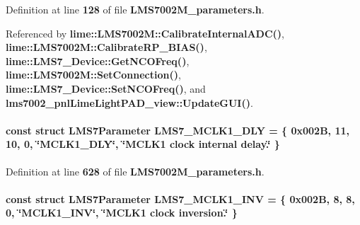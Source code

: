 Definition at line {\bf 128} of file {\bf L\+M\+S7002\+M\+\_\+parameters.\+h}.



Referenced by {\bf lime\+::\+L\+M\+S7002\+M\+::\+Calibrate\+Internal\+A\+D\+C()}, {\bf lime\+::\+L\+M\+S7002\+M\+::\+Calibrate\+R\+P\+\_\+\+B\+I\+A\+S()}, {\bf lime\+::\+L\+M\+S7\+\_\+\+Device\+::\+Get\+N\+C\+O\+Freq()}, {\bf lime\+::\+L\+M\+S7002\+M\+::\+Set\+Connection()}, {\bf lime\+::\+L\+M\+S7\+\_\+\+Device\+::\+Set\+N\+C\+O\+Freq()}, and {\bf lms7002\+\_\+pnl\+Lime\+Light\+P\+A\+D\+\_\+view\+::\+Update\+G\+U\+I()}.

\paragraph[{L\+M\+S7\+\_\+\+M\+C\+L\+K1\+\_\+\+D\+LY}]{\setlength{\rightskip}{0pt plus 5cm}const struct {\bf L\+M\+S7\+Parameter} L\+M\+S7\+\_\+\+M\+C\+L\+K1\+\_\+\+D\+LY = \{ 0x002\+B, 11, 10, 0, \char`\"{}\+M\+C\+L\+K1\+\_\+\+D\+L\+Y\char`\"{}, \char`\"{}\+M\+C\+L\+K1 clock internal delay.\char`\"{} \}\hspace{0.3cm}{\ttfamily [static]}}\label{LMS7002M__parameters_8h_a640edb57a5dd0a34865ff55148705ece}


Definition at line {\bf 628} of file {\bf L\+M\+S7002\+M\+\_\+parameters.\+h}.

\paragraph[{L\+M\+S7\+\_\+\+M\+C\+L\+K1\+\_\+\+I\+NV}]{\setlength{\rightskip}{0pt plus 5cm}const struct {\bf L\+M\+S7\+Parameter} L\+M\+S7\+\_\+\+M\+C\+L\+K1\+\_\+\+I\+NV = \{ 0x002\+B, 8, 8, 0, \char`\"{}\+M\+C\+L\+K1\+\_\+\+I\+N\+V\char`\"{}, \char`\"{}\+M\+C\+L\+K1 clock inversion.\char`\"{} \}\hspace{0.3cm}{\ttfamily [static]}}\label{LMS7002M__parameters_8h_ac7ae508c57d43a38d7dbf763e5e82c51}


